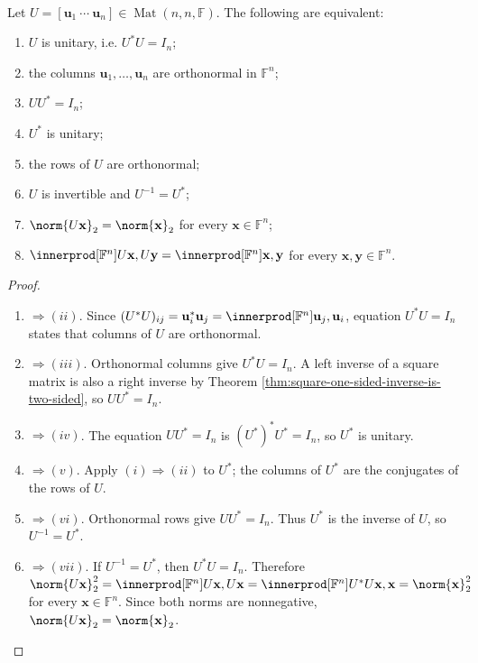 \begin{theorem} \label{thm:unitary-matrix-equivalent-conditions} \\
Let $U=[\mathbf{u}_1\ \cdots\ \mathbf{u}_n]\in\operatorname{Mat}(n,n,\mathbb{F})$. The following are equivalent:
\begin{enumerate}[label=\roman*.]
\setlength{\itemsep}{0pt}
\item $U$ is unitary, i.e. $U^*U=I_n$;
\item the columns $\mathbf{u}_1,\ldots,\mathbf{u}_n$ are orthonormal in $\mathbb{F}^n$;
\item $UU^*=I_n$;
\item $U^*$ is unitary;
\item the rows of $U$ are orthonormal;
\item $U$ is invertible and $U^{-1}=U^*$;
\item $\norm{U\mathbf{x}}_2=\norm{\mathbf{x}}_2$ for every $\mathbf{x}\in\mathbb{F}^n$;
\item $\innerprod[\mathbb{F}^n]{U\mathbf{x},U\mathbf{y}}=\innerprod[\mathbb{F}^n]{\mathbf{x},\mathbf{y}}$ for every $\mathbf{x},\mathbf{y}\in\mathbb{F}^n$.
\end{enumerate}
\begin{proof}
\begin{enumerate}[label=(\roman*).]
\setlength{\itemsep}{0pt}
\item[$(i)$]$\Rightarrow (ii)$. Since $(U^*U)_{ij}=\mathbf{u}_i^*\mathbf{u}_j=\innerprod[\mathbb{F}^n]{\mathbf{u}_j,\mathbf{u}_i}$, equation $U^*U=I_n$ states that columns of $U$ are orthonormal.
\item[$(ii)$]$\Rightarrow (iii)$. Orthonormal columns give $U^*U=I_n$. A left inverse of a square matrix is also a right inverse by Theorem \ref{thm:square-one-sided-inverse-is-two-sided}, so $UU^*=I_n$.
\item[$(iii)$]$\Rightarrow (iv)$. The equation $UU^*=I_n$ is $(U^*)^*U^*=I_n$, so $U^*$ is unitary.
\item[$(iv)$]$\Rightarrow (v)$. Apply $(i)\Rightarrow(ii)$ to $U^*$; the columns of $U^*$ are the conjugates of the rows of $U$.
\item[$(v)$]$\Rightarrow (vi)$. Orthonormal rows give $UU^*=I_n$. Thus $U^*$ is the inverse of $U$, so $U^{-1}=U^*$.
\item[$(vi)$]$\Rightarrow (vii)$. If $U^{-1}=U^*$, then $U^*U=I_n$. Therefore $\norm{U\mathbf{x}}_2^2 =\innerprod[\mathbb{F}^n]{U\mathbf{x},U\mathbf{x}} =\innerprod[\mathbb{F}^n]{U^*U\mathbf{x},\mathbf{x}} =\norm{\mathbf{x}}_2^2$ for every $\mathbf{x}\in\mathbb{F}^n$. Since both norms are nonnegative, $\norm{U\mathbf{x}}_2=\norm{\mathbf{x}}_2$.

\end{enumerate}
\end{proof}
\end{theorem}
